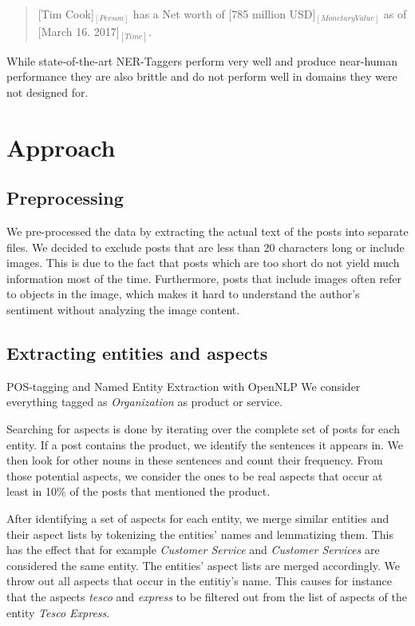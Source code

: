 \documentclass[10pt,a4paper]{article}
\begin{document}
		\begin{quote}
			[Tim Cook]$_{[Person]}$ has a Net worth of [785 million USD]$_{[Monetary Value]}$ as of [March 16. 2017]$_{[Time]}$.
		\end{quote}
		
		While state-of-the-art NER-Taggers perform very well and produce near-human performance they are also brittle and do not perform well in domains they were not designed for.
	
	\section{Approach}

		\subsection{Preprocessing}
		We pre-processed the data by extracting the actual text of the posts into separate files. We decided to exclude posts that are less than 20 characters long or include images. This is due to the fact that posts which are too short do not yield much information most of the time. Furthermore, posts that include images often refer to objects in the image, which makes it hard to understand the author's sentiment without analyzing the image content.
	
		\subsection{Extracting entities and aspects}
		\label{sec:entityextraction}
		POS-tagging and Named Entity Extraction with OpenNLP
		We consider everything tagged as \textit{Organization} as product or service.

		Searching for aspects is done by iterating over the complete set of posts for each entity. If a post contains the product, we identify the sentences it appears in. We then look for other nouns in these sentences and count their frequency. From those potential aspects, we consider the ones to be real aspects that occur at least in 10\% of the posts that mentioned the product.

		After identifying a set of aspects for each entity, we merge similar entities and their aspect lists by tokenizing the entities' names and lemmatizing them. This has the effect that for example \textit{Customer Service} and \textit{Customer Services} are considered the same entity. The entities' aspect lists are merged accordingly. We throw out all aspects that occur in the entitiy's name. This causes for instance that the aspects \textit{tesco} and \textit{express} to be filtered out from the list of aspects of the entity \textit{Tesco Express}.
\end{document}
